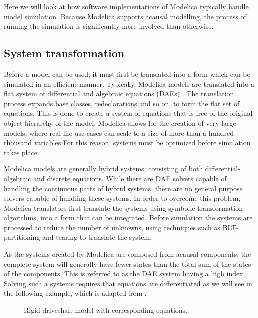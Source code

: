\documentclass[\rootfolder/main.tex]{subfiles}
\begin{document}
Here we will look at how software implementations of Modelica typically handle model simulation.
Because Modelica supports acausal modelling, the process of running the simulation is significantly more involved than otherwise.

\subsection{System transformation}

Before a model can be used, it must first be translated into a form which can be simulated in an efficient manner.
Typically, Modelica models are translated into a flat system of differential and algebraic equations (DAEs) \cite{openmodelica.org:lundvall:sims:2005}.
The translation process expands base classes, redeclarations and so on, to form the flat set of equations.
This is done to create a system of equations that is free of the original object hierarchy of the model.
Modelica allows for the creation of very large models, where real-life use cases can scale to a size of more than a hundred thousand variables
For this reason, systems must be optimized before simulation takes place.

Modelica models are generally hybrid systems, consisting of both differential-algebraic and discrete equations.
While there are DAE solvers capable of handling the continuous parts of hybrid systems, there are no general purpose solvers capable of handling these systems.
In order to overcome this problem, Modelica translators first translate the systems using symbolic transformation algorithms, into a form that can be integrated.
Before simulation the systems are processed to reduce the number of unknowns, using techniques such as BLT-partitioning and tearing \cite{clauss2002} to translate the system.

As the systems created by Modelica are composed from acausal components, the complete system will generally have fewer states than the total sum of the states of the components.
This is referred to as the DAE system having a high index.
Solving such a systems requires that equations are differentiated as we will see in the following example, which is adapted from \cite{clauss2002}.

\begin{figure}[ht]
	\begin{minipage}[c]{.75\columnwidth}
	\end{minipage}%
	\begin{minipage}[c]{.25\columnwidth}
	\end{minipage}
    \caption{Rigid driveshaft model with corresponding equations.}
\end{figure}
\end{document}
